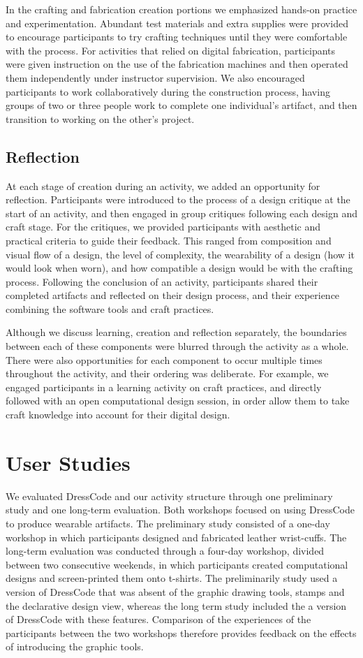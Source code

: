 \documentclass{sigchi}
\begin{document}
In the crafting and fabrication creation portions we emphasized hands-on practice and experimentation. Abundant test materials and extra supplies were provided to encourage participants to try crafting techniques until they were comfortable with the process. For activities that relied on digital fabrication, participants were given instruction on the use of the fabrication machines and then operated them independently under instructor supervision. We also encouraged participants to work collaboratively during the construction process, having groups of two or three people work to complete one individual's artifact, and then transition to working on the other's project. 

\subsection{Reflection}
At each stage of creation during an activity, we added an opportunity for reflection. Participants were introduced to the process of a design critique at the start of an activity, and then engaged in group critiques following each design and craft stage. For the critiques, we provided participants with  aesthetic and practical criteria to  guide their feedback. This ranged from composition and visual flow of a design, the level of complexity, the wearability of a design (how it would look when worn), and how compatible a design would be with the crafting process. Following the conclusion of an activity, participants shared their completed artifacts and reflected on their design process, and their experience combining the software tools and craft practices. 

Although we discuss learning, creation and reflection separately, the boundaries between each of these components were blurred through the activity as a whole. There were also opportunities for each component to occur multiple times throughout the activity, and their ordering was deliberate. For example, we engaged participants in a learning activity on craft practices, and directly followed with an open computational design session, in order allow them to take craft knowledge into account for their digital design. 

\section{User Studies}
We evaluated DressCode and our activity structure through one preliminary study and one long-term evaluation. Both workshops focused on using DressCode to produce wearable artifacts. The preliminary study consisted of a one-day workshop in which participants designed and fabricated leather wrist-cuffs. The long-term evaluation was conducted through a four-day workshop, divided between two consecutive weekends, in which participants created computational designs and screen-printed them onto t-shirts. The preliminarily study used a version of DressCode that was absent of the graphic drawing tools, stamps and the declarative design view, whereas the long term study included the a version of DressCode with these features. Comparison of the experiences of the participants between the two workshops therefore provides feedback on the effects of introducing the graphic tools.
\end{document}
